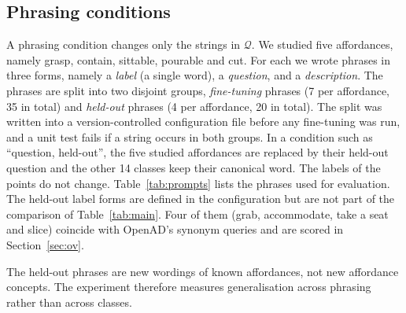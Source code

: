 \documentclass[conference]{IEEEtran}
\begin{document}
\subsection{Phrasing conditions}
\label{sec:conditions}
A phrasing condition changes only the strings in $\mathcal{Q}$. We studied five affordances, namely grasp, contain, sittable, pourable and cut. For each we wrote phrases in three forms, namely a \emph{label} (a single word), a \emph{question}, and a \emph{description}. The phrases are split into two disjoint groups, \emph{fine-tuning} phrases (7 per affordance, 35 in total) and \emph{held-out} phrases (4 per affordance, 20 in total). The split was written into a version-controlled configuration file before any fine-tuning was run, and a unit test fails if a string occurs in both groups. In a condition such as ``question, held-out'', the five studied affordances are replaced by their held-out question and the other 14 classes keep their canonical word. The labels of the points do not change. Table~\ref{tab:prompts} lists the phrases used for evaluation. The held-out label forms are defined in the configuration but are not part of the comparison of Table~\ref{tab:main}. Four of them (grab, accommodate, take a seat and slice) coincide with OpenAD's synonym queries and are scored in Section~\ref{sec:ov}.

The held-out phrases are new wordings of known affordances, not new affordance concepts. The experiment therefore measures generalisation across phrasing rather than across classes.
\end{document}
